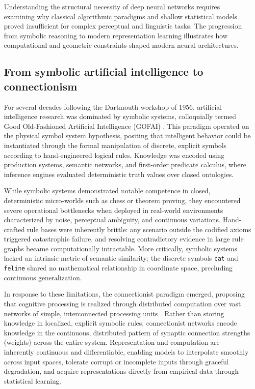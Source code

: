 \documentclass[../../main.tex]{subfiles}
\begin{document}
Understanding the structural necessity of deep neural networks requires examining why classical algorithmic paradigms and shallow statistical models proved insufficient for complex perceptual and linguistic tasks. The progression from symbolic reasoning to modern representation learning illustrates how computational and geometric constraints shaped modern neural architectures.

\subsection{From symbolic artificial intelligence to connectionism}
\label{subsec:symbolic_to_connectionism}

For several decades following the Dartmouth workshop of 1956, artificial intelligence research was dominated by symbolic systems, colloquially termed Good Old-Fashioned Artificial Intelligence (GOFAI) \citep{russell2020artificial}. This paradigm operated on the physical symbol system hypothesis, positing that intelligent behavior could be instantiated through the formal manipulation of discrete, explicit symbols according to hand-engineered logical rules. Knowledge was encoded using production systems, semantic networks, and first-order predicate calculus, where inference engines evaluated deterministic truth values over closed ontologies.

While symbolic systems demonstrated notable competence in closed, deterministic micro-worlds such as chess or theorem proving, they encountered severe operational bottlenecks when deployed in real-world environments characterized by noise, perceptual ambiguity, and continuous variations. Hand-crafted rule bases were inherently brittle: any scenario outside the codified axioms triggered catastrophic failure, and resolving contradictory evidence in large rule graphs became computationally intractable. More critically, symbolic systems lacked an intrinsic metric of semantic similarity; the discrete symbols \texttt{cat} and \texttt{feline} shared no mathematical relationship in coordinate space, precluding continuous generalization.

In response to these limitations, the connectionist paradigm emerged, proposing that cognitive processing is realized through distributed computation over vast networks of simple, interconnected processing units \citep{mcculloch1943,rosenblatt1958,rumelhart1986}. Rather than storing knowledge in localized, explicit symbolic rules, connectionist networks encode knowledge in the continuous, distributed pattern of synaptic connection strengths (weights) across the entire system. Representation and computation are inherently continuous and differentiable, enabling models to interpolate smoothly across input spaces, tolerate corrupt or incomplete inputs through graceful degradation, and acquire representations directly from empirical data through statistical learning.
\end{document}
